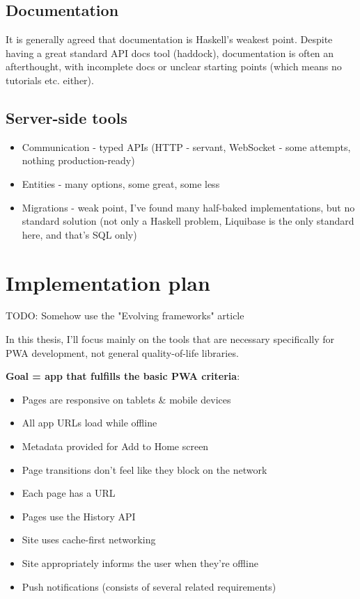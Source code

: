 \documentclass[english,odsaz]{fitthesis}
\begin{document}
\subsection{Documentation}
\label{sec:org6c008b1}
It is generally agreed that documentation is Haskell's weakest point. Despite
having a great standard API docs tool (haddock), documentation is often an
afterthought, with incomplete docs or unclear starting points (which means no
tutorials etc. either).

\subsection{Server-side tools}
\label{sec:org8ab9455}
\begin{itemize}
\item Communication - typed APIs (HTTP - servant, WebSocket - some attempts, nothing
production-ready)
\item Entities - many options, some great, some less
\item Migrations - weak point, I've found many half-baked implementations, but no
standard solution (not only a Haskell problem, Liquibase is the only standard
here, and that's SQL only)
\end{itemize}

\section{Implementation plan}
\label{sec:orgdb7a8d2}
TODO: Somehow use the "Evolving frameworks" article

In this thesis, I'll focus mainly on the tools that are necessary specifically
for PWA development, not general quality-of-life libraries.

\textbf{Goal = app that fulfills the basic PWA criteria}:
\begin{itemize}
\item Pages are responsive on tablets \& mobile devices
\item All app URLs load while offline
\item Metadata provided for Add to Home screen
\item Page transitions don't feel like they block on the network
\item Each page has a URL
\item Pages use the History API
\item Site uses cache-first networking
\item Site appropriately informs the user when they're offline
\item Push notifications (consists of several related requirements)
\end{itemize}
\end{document}

